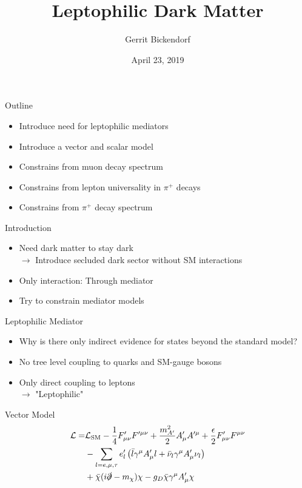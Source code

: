 \documentclass[11pt]{beamer}
\author{Gerrit Bickendorf}
\title{Leptophilic Dark Matter}
\date{April 23, 2019}
\numberwithin{equation}{section}
\begin{document}
\beamertemplatenavigationsymbolsempty
\begin{frame}
\titlepage
\end{frame}


\begin{frame}{Outline}
\begin{itemize}
\pause
\item Introduce need for leptophilic mediators
\pause
\item Introduce a vector and scalar model
\pause
\item Constrains from muon decay spectrum
\pause
\item Constrains from lepton universality in $\pi^+$ decays
\pause
\item Constrains from $\pi^+$ decay spectrum
\end{itemize}
\end{frame}

\begin{frame}{Introduction}
\begin{itemize}
\item Need dark matter to stay dark \\
\pause
$\rightarrow$ Introduce secluded dark sector without SM interactions
\pause 
\item Only interaction: Through mediator
\pause
\item Try to constrain mediator models
\end{itemize}
\end{frame}

\begin{frame}{Leptophilic Mediator}
\begin{itemize}
\item Why is there only indirect evidence for states beyond the standard model?
\pause
\item No tree level coupling to quarks and SM-gauge bosons
\pause
\item Only direct coupling to leptons\\
$\rightarrow$ "Leptophilic"
\end{itemize}
\end{frame}

\begin{frame}{Vector Model}
\begin{align*}
\mathcal{L}=& \mathcal{L}_\text{SM}-\frac{1}{4}F_{\mu\nu}'F'^{\mu\nu}+\frac{m_{A'}^2}{2}A_\mu'A'^\mu +\frac{\epsilon}{2}F_{\mu\nu}'F^{\mu\nu}\\
&-\sum_{l=e,\mu,\tau} e'_l\left(\bar{l}\gamma^\mu A'_\mu l+\bar{\nu}_l\gamma^\mu A'_\mu \nu_l\right)\\&+\bar{\chi}(i\slashed{\partial}-m_\chi)\chi -g_D\bar{\chi}\gamma^\mu A_\mu'\chi
\end{align*}
\end{frame}
\end{document}

